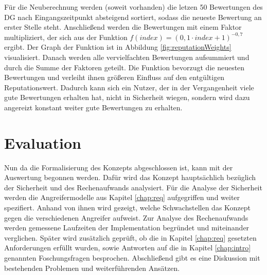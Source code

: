 \documentclass[
	fontsize=11pt,
	headings=small,
	parskip=half,           %
	bibliography=totoc,
	numbers=noenddot,       %
	open=any,               %
]{scrreprt}
\begin{document}
Für die Neuberechnung werden (soweit vorhanden) die letzen 50 Bewertungen des DG nach Eingangszeitpunkt absteigend sortiert, sodass die neueste Bewertung an erster Stelle steht. Anschließend werden die Bewertungen mit einem Faktor multipliziert, der sich aus der Funktion $f(index)=(0,1\cdot index + 1)^{-0,7}$ ergibt. Der Graph der Funktion ist in Abbildung \ref{fig:reputationWeights} visualisiert. Danach werden alle vervielfachten Bewertungen aufsummiert und durch die Summe der Faktoren geteilt. Die Funktion bevorzugt die neuesten Bewertungen und verleiht ihnen größeren Einfluss auf den entgültigen Reputationswert. Dadurch kann sich ein Nutzer, der in der Vergangenheit viele gute Bewertungen erhalten hat, nicht in Sicherheit wiegen, sondern wird dazu angereizt konstant weiter gute Bewertungen zu erhalten.




\chapter{Evaluation}
\label{chap:auswertung}
Nun da die Formalisierung des Konzepts abgeschlossen ist, kann mit der Auswertung begonnen werden. Dafür wird das Konzept hauptsächlich bezüglich der Sicherheit und des Rechenaufwands analysiert. Für die Analyse der Sicherheit werden die Angreifermodelle aus Kapitel \ref{chap:req} aufgegriffen und weiter spezifiert. Anhand von ihnen wird gezeigt, welche Schwachstellen das Konzept gegen die verschiedenen Angreifer aufweist. Zur Analyse des Rechenaufwands werden gemessene Laufzeiten der Implementation begründet und miteinander verglichen. Später wird zusätzlich geprüft, ob die in Kapitel \ref{chap:req} gesetzten Anforderungen erfüllt wurden, sowie Antworten auf die in Kapitel \ref{chap:intro} genannten Foschungsfragen besprochen. Abschließend gibt es eine Diskussion mit bestehenden Problemen und weiterführenden Ansätzen.
\end{document}
